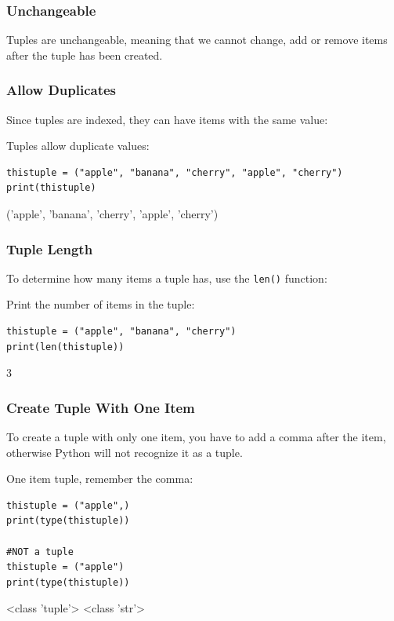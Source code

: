 \documentclass[12pt,a4paper]{article}
\newcommand{\code}[1]{%
	\colorbox{backcolour}{\lstinline{#1}}%
}
\begin{document}
\subsubsection{Unchangeable}

Tuples are unchangeable, meaning that we cannot change, add or remove items
after the tuple has been created.
\subsubsection{Allow Duplicates}

Since tuples are indexed, they can have items with the same value:

\begin{ebox}
Tuples allow duplicate values:
	\begin{lstlisting}
thistuple = ("apple", "banana", "cherry", "apple", "cherry")
print(thistuple)
	\end{lstlisting}
\tcblower
	\begin{vercode}
('apple', 'banana', 'cherry', 'apple', 'cherry')
	\end{vercode}
\end{ebox}
\subsubsection{Tuple Length}

To determine how many items a tuple has, use the \code{len()} function:

\begin{ebox}
Print the number of items in the tuple:
	\begin{lstlisting}
thistuple = ("apple", "banana", "cherry")
print(len(thistuple))
	\end{lstlisting}
\tcblower
	\begin{vercode}
3
	\end{vercode}
\end{ebox}
\subsubsection{Create Tuple With One Item}

To create a tuple with only one item, you have to add a comma after the item,
otherwise Python will not recognize it as a tuple.

\begin{ebox}
One item tuple, remember the comma:
	\begin{lstlisting}
thistuple = ("apple",)
print(type(thistuple))

#NOT a tuple
thistuple = ("apple")
print(type(thistuple))
	\end{lstlisting}
\tcblower
	\begin{vercode}
<class 'tuple'>
<class 'str'>
	\end{vercode}
\end{ebox}
\end{document}
